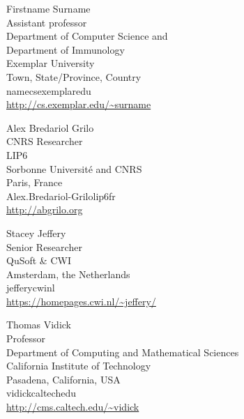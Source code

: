 \begin{tocauthors}
\begin{tocinfo}[coladangelo]
 Firstname Surname\\
 Assistant professor\\
 Department of Computer Science and\\
 Department of Immunology\\
 Exemplar University\\
 Town, State/Province, Country\\
 name\tocat{}cs\tocdot{}exemplar\tocdot{}edu \\   %
 \url{http://cs.exemplar.edu/~surname}      %
\end{tocinfo}
\begin{tocinfo}[grilo]
 Alex Bredariol Grilo\\
 CNRS Researcher\\
 LIP6\\
 Sorbonne Universit\'e and CNRS\\
 Paris, France\\
 Alex.Bredariol-Grilo\tocat{}lip6\tocdot{}fr \\   %
 \url{http://abgrilo.org}      %
\end{tocinfo}
\begin{tocinfo}[jeffery]
 Stacey Jeffery\\
 Senior Researcher\\
 QuSoft \& CWI\\
 Amsterdam, the Netherlands\\
 jeffery\tocat{}cwi\tocdot{}nl \\   %
 \url{https://homepages.cwi.nl/~jeffery/}      %
\end{tocinfo}
\begin{tocinfo}[vidick]
 Thomas Vidick\\
 Professor\\
 Department of Computing and Mathematical Sciences\\
 California Institute of Technology\\
 Pasadena, California, USA\\
 vidick\tocat{}caltech\tocdot{}edu \\   %
 \url{http://cms.caltech.edu/~vidick}      %
\end{tocinfo}
\end{tocauthors}

